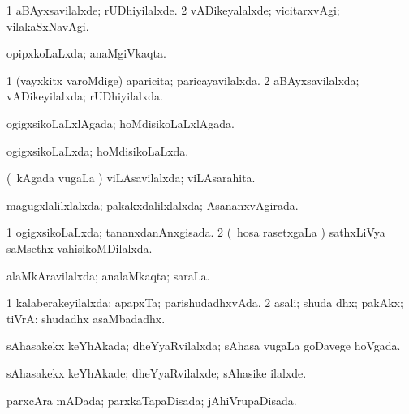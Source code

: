 \bentry
{} 
\gl{\kirxvi}
\expl{}
\bmng
\bnum
\num{1} aBAyxsavilalxde; rUDhiyilalxde. 
\num{2} vADikeyalalxde; vicitarxvAgi; vilakaSxNavAgi. 
\enum
\emng
\eentry

\bentry
{} 
\gl{\gu}
\expl{}
\bmng
opipxkoLaLxda; anaMgiVkaqta. 
\emng
\eentry

\bentry
{} 
\gl{\gu}
\expl{}
\bmng
\bnum
\num{1} (vayxkitx \mo varoMdige) aparicita; paricayavilalxda. 
\num{2} aBAyxsavilalxda; vADikeyilalxda; rUDhiyilalxda. 
\enum
\emng
\eentry

\bentry
{} 
\gl{\gu}
\expl{}
\bmng
ogigxsikoLaLxlAgada; hoMdisikoLaLxlAgada. 
\emng
\eentry

\bentry
{} 
\gl{\gu}
\expl{}
\bmng
ogigxsikoLaLxda; hoMdisikoLaLxda. 
\emng
\eentry

\bentry
{} 
\gl{\gu}
\expl{}
\bmng
(\kanmu\ kAgada \mo vugaLa \vi) viLAsavilalxda; viLAsarahita. 
\emng
\eentry

\bentry
{} 
\gl{\gu}
\expl{}
\bmng
magugxlalilxlalxda; pakakxdalilxlalxda; AsananxvAgirada. 
\emng
\eentry

\bentry
{} 
\gl{\gu}
\expl{}
\bmng
\bnum
\num{1} ogigxsikoLaLxda; tananxdanAnxgisada. 
\num{2} (\kanmu\ hosa rasetxgaLa \vi) sathxLiVya saMsethx vahisikoMDilalxda. 
\enum
\emng
\eentry

\bentry
{} 
\gl{\gu}
\expl{}
\bmng
alaMkAravilalxda; analaMkaqta; saraLa. 
\emng
\eentry

\bentry
{} 
\gl{\gu}
\expl{}
\bmng
\bnum
\num{1} kalaberakeyilalxda; apapxTa; parishudadhxvAda. 
\num{2} asali; shuda dhx; pakAkx; tiVrA:  shudadhx asaMbadadhx. 
\enum
\emng
\eentry

\bentry
{} 
\gl{\gu}
\expl{}
\bmng
sAhasakekx keYhAkada; dheYyaRvilalxda; sAhasa \mo vugaLa goDavege hoVgada. 
\emng
\eentry

\bentry
{} 
\gl{\kirxvi}
\expl{}
\bmng
sAhasakekx keYhAkade; dheYyaRvilalxde; sAhasike ilalxde. 
\emng
\eentry

\bentry
{} 
\gl{\gu}
\expl{}
\bmng
parxcAra mADada; parxkaTapaDisada; jAhiVrupaDisada. 
\emng
\eentry

